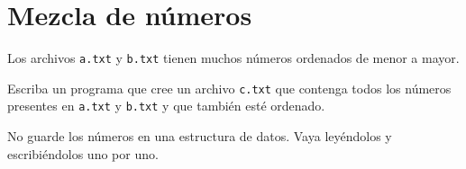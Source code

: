 \section{Mezcla de números}

Los archivos \verb!a.txt! y \verb!b.txt! tienen muchos números ordenados de
menor a mayor.

Escriba un programa que cree un archivo \verb!c.txt! que contenga
todos los números presentes en \verb!a.txt! y \verb!b.txt! y
que también esté ordenado.

No guarde los números en una estructura de datos. Vaya leyéndolos y
escribiéndolos uno por uno.
